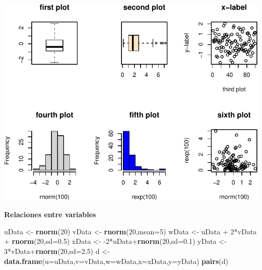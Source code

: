 \documentclass[]{article}
\newenvironment{Shaded}{\begin{snugshade}}{\end{snugshade}}
\newcommand{\KeywordTok}[1]{\textcolor[rgb]{0.13,0.29,0.53}{\textbf{{#1}}}}
\newcommand{\DataTypeTok}[1]{\textcolor[rgb]{0.13,0.29,0.53}{{#1}}}
\newcommand{\DecValTok}[1]{\textcolor[rgb]{0.00,0.00,0.81}{{#1}}}
\newcommand{\FloatTok}[1]{\textcolor[rgb]{0.00,0.00,0.81}{{#1}}}
\newcommand{\StringTok}[1]{\textcolor[rgb]{0.31,0.60,0.02}{{#1}}}
\newcommand{\NormalTok}[1]{{#1}}
\numberwithin{equation}{section}
\begin{document}
\includegraphics{tema1_files/figure-latex/unnamed-chunk-83-1.pdf}

\textbf{Relaciones entre variables}

\begin{Shaded}
\begin{Highlighting}[]
\NormalTok{uData <-}\StringTok{ }\KeywordTok{rnorm}\NormalTok{(}\DecValTok{20}\NormalTok{)}
\NormalTok{vData <-}\StringTok{ }\KeywordTok{rnorm}\NormalTok{(}\DecValTok{20}\NormalTok{,}\DataTypeTok{mean=}\DecValTok{5}\NormalTok{)}
\NormalTok{wData <-}\StringTok{ }\NormalTok{uData +}\StringTok{ }\DecValTok{2}\NormalTok{*vData +}\StringTok{ }\KeywordTok{rnorm}\NormalTok{(}\DecValTok{20}\NormalTok{,}\DataTypeTok{sd=}\FloatTok{0.5}\NormalTok{)}
\NormalTok{xData <-}\StringTok{ }\NormalTok{-}\DecValTok{2}\NormalTok{*uData+}\KeywordTok{rnorm}\NormalTok{(}\DecValTok{20}\NormalTok{,}\DataTypeTok{sd=}\FloatTok{0.1}\NormalTok{)}
\NormalTok{yData <-}\StringTok{  }\DecValTok{3}\NormalTok{*vData+}\KeywordTok{rnorm}\NormalTok{(}\DecValTok{20}\NormalTok{,}\DataTypeTok{sd=}\FloatTok{2.5}\NormalTok{)}
\NormalTok{d <-}\StringTok{ }\KeywordTok{data.frame}\NormalTok{(}\DataTypeTok{u=}\NormalTok{uData,}\DataTypeTok{v=}\NormalTok{vData,}\DataTypeTok{w=}\NormalTok{wData,}\DataTypeTok{x=}\NormalTok{xData,}\DataTypeTok{y=}\NormalTok{yData)}
\KeywordTok{pairs}\NormalTok{(d)}
\end{Highlighting}
\end{Shaded}
\end{document}
